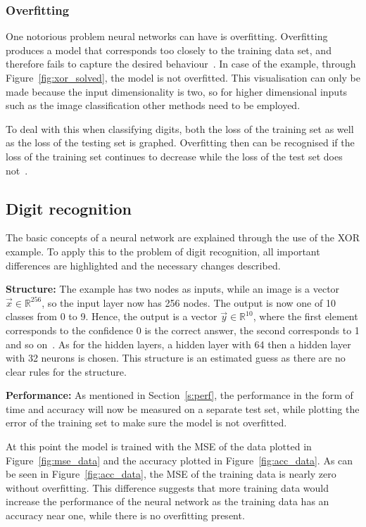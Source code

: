 \subsubsection{Overfitting}
One notorious problem neural networks can have is overfitting. Overfitting produces a model that corresponds too closely to the training data set, and therefore fails to capture the desired behaviour~\cite{Hawkins2004}.
In case of the example, through Figure~\ref{fig:xor_solved}, the model is not overfitted.
This visualisation can only be made because the input dimensionality is two, so for higher dimensional inputs such as the image classification other methods need to be employed.

To deal with this when classifying digits, both the loss of the training set as well as the loss of the testing set is graphed. Overfitting then can be recognised if the loss of the training set continues to decrease while the loss of the test set does not~\cite{Higham2018}.

\subsection{Digit recognition}\label{s:digit_recognition}
The basic concepts of a neural network are explained through the use of the XOR example. To apply this to the problem of digit recognition, all important differences are highlighted and the necessary changes described.

\textbf{Structure:} The example has two nodes as inputs, while an image is a vector \(\vec{x}\in\mathbb{R}^{256}\), so the input layer now has 256 nodes.
The output is now one of 10 classes from 0 to 9.
Hence, the output is a vector \(\vec{y} \in \mathbb{R}^{10}\), where the first element corresponds to the confidence 0 is the correct answer, the second corresponds to 1 and so on~\cite{Higham2018}.
As for the hidden layers, a hidden layer with 64 then a hidden layer with 32 neurons is chosen.
This structure is an estimated guess as there are no clear rules for the structure.

\textbf{Performance:} As mentioned in Section~\ref{s:perf}, the performance in the form of time and accuracy will now be measured on a separate test set, while plotting the error of the training set to make sure the model is not overfitted.

At this point the model is trained with the MSE of the data plotted in Figure~\ref{fig:mse_data} and the accuracy plotted in Figure~\ref{fig:acc_data}.
As can be seen in Figure~\ref{fig:acc_data}, the MSE of the training data is nearly zero without overfitting.
This difference suggests that more training data would increase the performance of the neural network as the training data has an accuracy near one, while there is no overfitting present.

